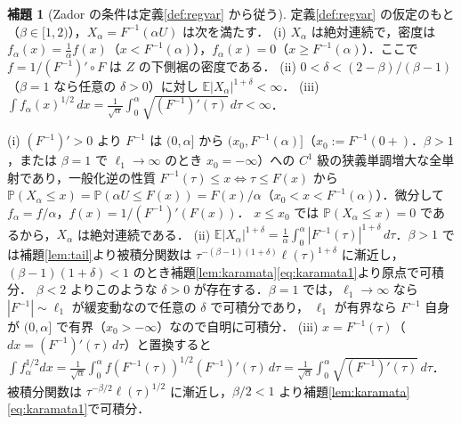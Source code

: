 \documentclass[a4paper,10pt]{jsarticle}
\makeatletter
\theoremstyle{definition}
\newtheorem{lemma}{補題}[section]
\renewenvironment{proof}[1][\proofname]{\par
  \pushQED{\qed}%
  \normalfont \topsep6\p@\@plus6\p@\relax
  \trivlist
  \item[\hskip\labelsep\textbf{#1}]\ignorespaces
}{%
  \popQED\endtrivlist\@endpefalse
}
\renewcommand{\proofname}{証明}
\newcommand{\Finv}{F^{-1}}
\newcommand{\E}{\mathbb{E}}
\newcommand{\Prob}{\mathbb{P}}
\makeatother
\begin{document}
\begin{lemma}[Zador の条件は定義\ref{def:regvar} から従う]
\label{lem:zador-cond}
定義\ref{def:regvar} の仮定のもと（$\beta\in[1,2)$），$X_\alpha=\Finv(\alpha U)$ は次を満たす．
(i) $X_\alpha$ は絶対連続で，密度は $f_\alpha(x)=\frac1\alpha f(x)$（$x<\Finv(\alpha)$），$f_\alpha(x)=0$（$x\ge\Finv(\alpha)$）．ここで $f=1/(\Finv)'\circ F$ は $Z$ の下側裾の密度である．
(ii) $0<\delta<(2-\beta)/(\beta-1)$（$\beta=1$ なら任意の $\delta>0$）に対し $\E|X_\alpha|^{1+\delta}<\infty$．
(iii) $\displaystyle\int f_\alpha(x)^{1/2}\,dx=\frac1{\sqrt\alpha}\int_0^\alpha\sqrt{(\Finv)'(\tau)}\,d\tau<\infty$．
\end{lemma}
\begin{proof}
(i) $(\Finv)'>0$ より $\Finv$ は $(0,\alpha]$ から $(x_0,\Finv(\alpha)]$（$x_0:=\Finv(0+)$．$\beta>1$，または $\beta=1$ で $\ell_1\to\infty$ のとき $x_0=-\infty$）への
$C^1$ 級の狭義単調増大な全単射であり，一般化逆の性質 $\Finv(\tau)\le x\iff\tau\le F(x)$ から
$\Prob(X_\alpha\le x)=\Prob(\alpha U\le F(x))=F(x)/\alpha$（$x_0<x<\Finv(\alpha)$）．微分して $f_\alpha=f/\alpha$，$f(x)=1/(\Finv)'(F(x))$．
$x\le x_0$ では $\Prob(X_\alpha\le x)=0$ であるから，$X_\alpha$ は絶対連続である．
(ii) $\E|X_\alpha|^{1+\delta}=\frac1\alpha\int_0^\alpha|\Finv(\tau)|^{1+\delta}\,d\tau$．$\beta>1$ では補題\ref{lem:tail}より被積分関数は
$\tau^{-(\beta-1)(1+\delta)}\ell(\tau)^{1+\delta}$ に漸近し，$(\beta-1)(1+\delta)<1$ のとき補題\ref{lem:karamata}\eqref{eq:karamata1}より原点で可積分．
$\beta<2$ よりこのような $\delta>0$ が存在する．$\beta=1$ では，$\ell_1\to\infty$ なら $|\Finv|\sim\ell_1$ が緩変動なので任意の $\delta$ で可積分であり，
$\ell_1$ が有界なら $\Finv$ 自身が $(0,\alpha]$ で有界（$x_0>-\infty$）なので自明に可積分．
(iii) $x=\Finv(\tau)$（$dx=(\Finv)'(\tau)\,d\tau$）と置換すると
$\int f_\alpha^{1/2}dx=\frac1{\sqrt\alpha}\int_0^\alpha f(\Finv(\tau))^{1/2}(\Finv)'(\tau)\,d\tau=\frac1{\sqrt\alpha}\int_0^\alpha\sqrt{(\Finv)'(\tau)}\,d\tau$．
被積分関数は $\tau^{-\beta/2}\ell(\tau)^{1/2}$ に漸近し，$\beta/2<1$ より補題\ref{lem:karamata}\eqref{eq:karamata1}で可積分．
\end{proof}
\end{document}
